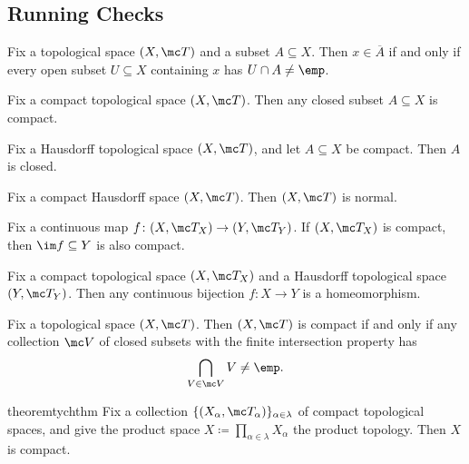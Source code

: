 \documentclass{article}
\begin{document}
\subsection{Running Checks}
\begin{lemma} \label{lem:betterclosure}
	Fix a topological space $(X,\mc T)$ and a subset $A\subseteq X$. Then $x\in\overline A$ if and only if every open subset $U\subseteq X$ containing $x$ has $U\cap A\ne\emp$.
\end{lemma}
\begin{lemma} \label{lem:closedincompactiscompact}
	Fix a compact topological space $(X,\mc T)$. Then any closed subset $A\subseteq X$ is compact.
\end{lemma}
\begin{lemma} \label{cor:compact-in-haus-is-closed}
	Fix a Hausdorff topological space $(X,\mc T)$, and let $A\subseteq X$ be compact. Then $A$ is closed.
\end{lemma}
\begin{proposition} \label{prop:comp-haus-is-normal}
	Fix a compact Hausdorff space $(X,\mc T)$. Then $(X,\mc T)$ is normal.
\end{proposition}
\begin{lemma} \label{lem:compactimage}
	Fix a continuous map $f\colon(X,\mc T_X)\to(Y,\mc T_Y)$. If $(X,\mc T_X)$ is compact, then $\im f\subseteq Y$ is also compact.
\end{lemma}
\begin{proposition}
	Fix a compact topological space $(X,\mc T_X)$ and a Hausdorff topological space $(Y,\mc T_Y)$. Then any continuous bijection $f\colon X\to Y$ is a homeomorphism.
\end{proposition}
\begin{proposition} \label{prop:compactviafip}
	Fix a topological space $(X,\mc T)$. Then $(X,\mc T)$ is compact if and only if any collection $\mc V$ of closed subsets with the finite intersection property has
	\[\bigcap_{V\in\mc V}V\ne\emp.\]
\end{proposition}
\begin{restatable}[Tychonoff]{theorem}{tychthm} \label{thm:tych}
	Fix a collection $\{(X_\alpha,\mc T_\alpha)\}_{\alpha\in\lambda}$ of compact topological spaces, and give the product space $X\coloneqq\prod_{\alpha\in\lambda}X_\alpha$ the product topology. Then $X$ is compact.
\end{restatable}
\end{document}
